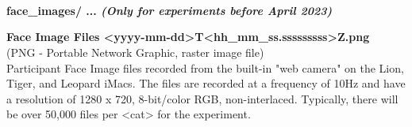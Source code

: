 \begin{description}
\textbf{\\\\\\}
\begin{addmargin}[0em]{0em} %
    \label{face_images/<yyyy-mm-dd>T<hh_mm_ss.sssssssss>Z.png}
    \textbf{face\_images/ ... \textit{(Only for experiments before April 2023)}}
    \begin{addmargin}[1em]{0em} %
        \textbf{Face Image Files <yyyy-mm-dd>T<hh\_mm\_ss.sssssssss>Z.png}\\
        (PNG - Portable Network Graphic, raster image file)\\
        Participant Face Image files recorded from the built-in "web camera" on the Lion, Tiger, and Leopard iMacs.
        The files are recorded at a frequency of 10Hz and have a resolution of 1280 x 720, 8-bit/color RGB, non-interlaced.
        Typically, there will be over 50,000 files per <cat> for the experiment. 
    \end{addmargin} %
\end{addmargin} %



\end{description}
